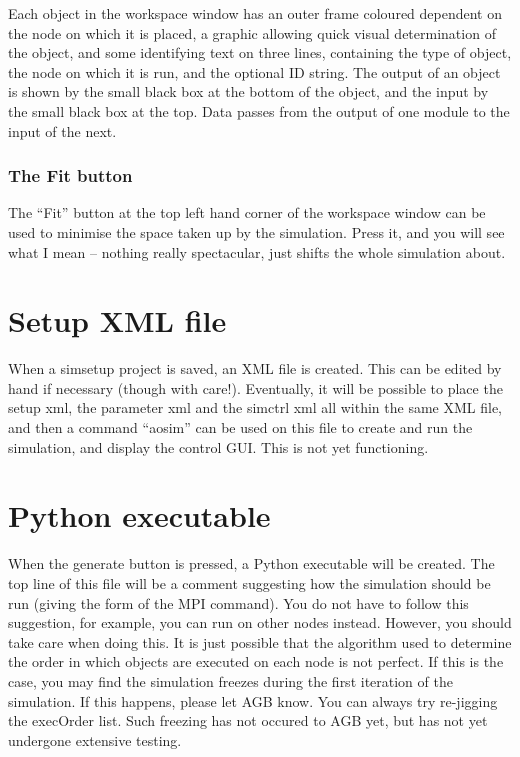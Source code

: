 \documentclass{article}
\begin{document}
Each object in the workspace window has an outer frame coloured
dependent on the node on which it is placed, a graphic allowing quick
visual determination of the object, and some identifying text on three
lines, containing the type of object, the node on which it is run, and
the optional ID string.  The output of an object is shown by the small
black box at the bottom of the object, and the input by the small
black box at the top.  Data passes from the output of one module to
the input of the next.

\subsubsection{The Fit button}
The ``Fit'' button at the top left hand corner of the workspace window
can be used to minimise the space taken up by the simulation.  Press
it, and you will see what I mean -- nothing really spectacular, just
shifts the whole simulation about.

\section{Setup XML file}
When a simsetup project is saved, an XML file is created.  This can be
edited by hand if necessary (though with care!).  Eventually, it will
be possible to place the setup xml, the parameter xml and the simctrl
xml all within the same XML file, and then a command ``aosim'' can be
used on this file to create and run the simulation, and display the
control GUI.  This is not yet functioning.

\section{Python executable}
When the generate button is pressed, a Python executable will be
created.  The top line of this file will be a comment suggesting how
the simulation should be run (giving the form of the MPI command).
You do not have to follow this suggestion, for example, you can run on
other nodes instead.  However, you should take care when doing this.
It is just possible that the algorithm used to determine the order in
which objects are executed on each node is not perfect.  If this is
the case, you may find the simulation freezes during the first
iteration of the simulation.  If this happens, please let AGB know.
You can always try re-jigging the execOrder list.  Such freezing has
not occured to AGB yet, but has not yet undergone extensive testing.  
\end{document}

